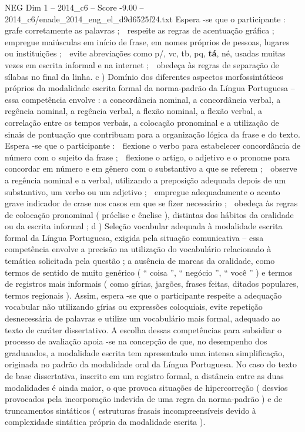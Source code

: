 \begin{textsample}{NEG Dim 1 – 2014\_c6 – Score -9.00 – 2014\_c6/enade\_2014\_eng\_el\_d9d6525f24.txt}
Espera -se que o participante :  grafe corretamente as palavras ;  respeite as regras de acentuação gráfica ;  empregue maiúsculas em início de frase, em nomes próprios de pessoas, lugares ou instituições ;  evite abreviações como p/, vc, tb, pq, \textbf{tá}, né, usadas muitas vezes em escrita informal e na internet ;  obedeça às regras de separação de sílabas no final da linha. c ) Domínio dos diferentes aspectos morfossintáticos próprios da modalidade escrita formal da norma-padrão da Língua Portuguesa – essa competência envolve : a concordância nominal, a concordância verbal, a regência nominal, a regência verbal, a flexão nominal, a flexão verbal, a correlação entre os tempos verbais, a colocação pronominal e a utilização de sinais de pontuação que contribuam para a organização lógica da frase e do texto.
Espera -se que o participante :  flexione o verbo para estabelecer concordância de número com o sujeito da frase ;  flexione o artigo, o adjetivo e o pronome para concordar em número e em gênero com o substantivo a que se referem ;  observe a regência nominal e a verbal, utilizando a preposição adequada depois de um substantivo, um verbo ou um adjetivo ;  empregue adequadamente o acento grave indicador de crase nos casos em que se fizer necessário ;  obedeça às regras de colocação pronominal ( próclise e ênclise ), distintas dos hábitos da oralidade ou da escrita informal ; d ) Seleção vocabular adequada à modalidade escrita formal da Língua Portuguesa, exigida pela situação comunicativa – essa competência envolve a precisão na utilização do vocabulário relacionado à temática solicitada pela questão ; a ausência de marcas da oralidade, como termos de sentido de muito genérico ( “ coisa ”, “ negócio ”, “ você ” ) e termos de registros mais informais ( como gírias, jargões, frases feitas, ditados populares, termos regionais ).
Assim, espera -se que o participante respeite a adequação vocabular não utilizando gírias ou expressões coloquiais, evite repetição desnecessária de palavras e utilize um vocabulário mais formal, adequado ao texto de caráter dissertativo.
A escolha dessas competências para subsidiar o processo de avaliação apoia -se na concepção de que, no desempenho dos graduandos, a modalidade escrita tem apresentado uma intensa simplificação, originada no padrão da modalidade oral da Língua Portuguesa.
No caso do texto de base dissertativa, inscrito em um registro formal, a distância entre as duas modalidades é ainda maior, o que provoca situações de hipercorreção ( desvios provocados pela incorporação indevida de uma regra da norma-padrão ) e de truncamentos sintáticos ( estruturas frasais incompreensíveis devido à complexidade sintática própria da modalidade escrita ).

\end{textsample}

